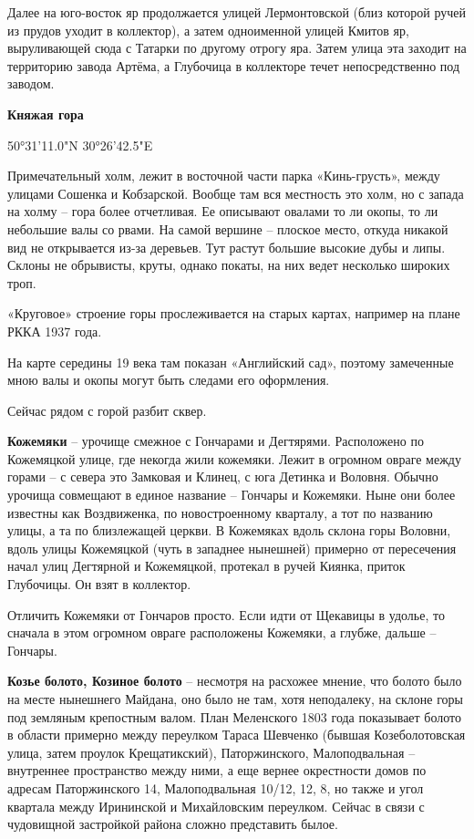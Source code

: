 Далее на юго-восток яр продолжается улицей Лермонтовской (близ которой ручей из прудов уходит в коллектор), а затем одноименной улицей Кмитов яр, выруливающей сюда с Татарки по другому отрогу яра. Затем улица эта заходит на территорию завода Артёма, а Глубочица в коллекторе течет непосредственно под заводом.\\

\medskip


\textbf{Княжая гора} 

50°31'11.0"N 30°26'42.5"E

Примечательный холм, лежит в восточной части парка «Кинь-грусть», между улицами Сошенка и Кобзарской. Вообще там вся местность это холм, но с запада на холму – гора более отчетливая. Ее описывают овалами то ли окопы, то ли небольшие валы со рвами. На самой вершине – плоское место, откуда никакой вид не открывается из-за деревьев. Тут растут большие высокие дубы и липы. Склоны не обрывисты, круты, однако покаты, на них ведет несколько широких троп. 

«Круговое» строение горы прослеживается на старых картах, например на плане РККА 1937 года.

На карте середины 19 века там показан «Английский сад», поэтому замеченные мною валы и окопы могут быть следами его оформления.

Сейчас рядом с горой разбит сквер.\\

\medskip


\textbf{Кожемяки} – урочище смежное с Гончарами и Дегтярями. Расположено по Кожемяцкой улице, где некогда жили кожемяки. Лежит в огромном овраге между горами – с севера это Замковая и Клинец, с юга Детинка и Воловня. Обычно урочища совмещают в единое название – Гончары и Кожемяки. Ныне они более известны как Воздвиженка, по новостроенному кварталу, а тот по названию улицы, а та по близлежащей церкви. В Кожемяках вдоль склона горы Воловни, вдоль улицы Кожемяцкой (чуть в западнее нынешней) примерно от пересечения начал улиц Дегтярной и Кожемяцкой, протекал в ручей Киянка, приток Глубочицы. Он взят в коллектор.

Отличить Кожемяки от Гончаров просто. Если идти от Щекавицы в удолье, то сначала в этом огромном овраге расположены Кожемяки, а глубже, дальше – Гончары.\\

\medskip

\textbf{Козье болото, Козиное болото} – несмотря на расхожее мнение, что болото было на месте нынешнего Майдана, оно было не там, хотя неподалеку, на склоне горы под земляным крепостным валом. План Меленского 1803 года показывает болото в области примерно между переулком Тараса Шевченко (бывшая Козеболотовская улица, затем проулок Крещатикский), Паторжинского, Малоподвальная – внутреннее пространство между ними, а еще вернее окрестности домов по адресам Паторжинского 14, Малоподвальная 10/12, 12, 8, но также и угол квартала между Ирининской и Михайловским переулком. Сейчас в связи с чудовищной застройкой района сложно представить былое.

